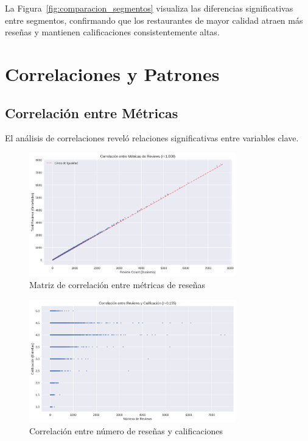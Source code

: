 \documentclass[12pt,a4paper,twoside,openany]{book}
\begin{document}
La Figura~\ref{fig:comparacion_segmentos} visualiza las diferencias significativas entre segmentos, confirmando que los restaurantes de mayor calidad atraen más reseñas y mantienen calificaciones consistentemente altas.

\section{Correlaciones y Patrones}

\subsection{Correlación entre Métricas}

El análisis de correlaciones reveló relaciones significativas entre variables clave.

\begin{figure}[H]
\centering
\includegraphics[width=0.8\textwidth]{figures/correlacion_metricas_reviews.png}
\caption{Matriz de correlación entre métricas de reseñas}
\label{fig:correlacion_metricas_reviews}
\end{figure}

\begin{figure}[H]
\centering
\includegraphics[width=0.8\textwidth]{figures/correlacion_reviews_calificacion.png}
\caption{Correlación entre número de reseñas y calificaciones}
\label{fig:correlacion_reviews_calificacion}
\end{figure}
\end{document}
